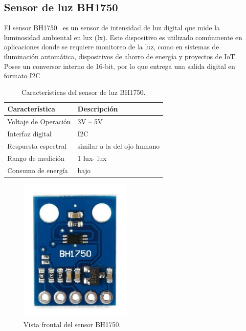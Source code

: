 \subsection{Sensor de luz BH1750}

El sensor BH1750~\cite{manual:BH1750} es un sensor de intensidad de luz digital que mide la luminosidad ambiental en lux (lx). Este dispositivo es utilizado comúnmente en aplicaciones donde se requiere monitoreo de la luz, como en sistemas de iluminación automática, dispositivos de ahorro de energía y proyectos de IoT.
Posee un conversor interno de 16-bit, por lo que entrega una salida digital en formato I2C

\begin{table}[htbp]
\begin{center}
\caption{Características del sensor de luz BH1750.}
\begin{tabular}{|l|l|}
\hline
\rowcolor[HTML]{C0C0C0} 
\textbf{Característica} & \textbf{Descripción}\\ \hline
Voltaje de Operación &  3V – 5V \\ \hline
Interfaz digital & I2C \\ \hline
Respuesta espectral & similar a la del ojo humano \\ \hline
Rango de medición & 1 lux\quad-\quad65535 lux \\ \hline
Consumo de energía & bajo \\ \hline
\end{tabular}
\end{center}
\end{table}

\begin{figure}[h]
    \centering
    \includegraphics[width=0.5\textwidth]{img/herramientas/bh1750_cara.png}
    \caption{Vista frontal del sensor BH1750.}
\end{figure}

